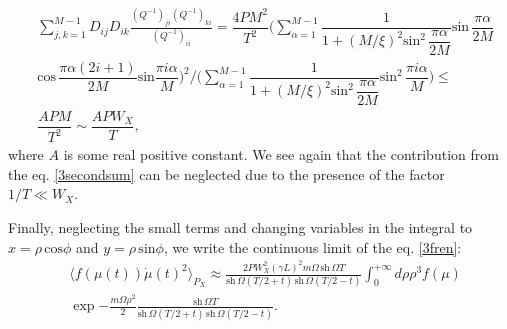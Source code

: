 \documentclass{article}
\begin{document}
\begin{align}\label{3secondsum}
    &\sum_{j,k=1}^{M-1}D_{ij}D_{ik}\frac{(Q^{-1})_{ji}(Q^{-1})_{ki}}{(Q^{-1})_{ii}} = \dfrac{4 P M^{2}}{T^{2}}\Bigg(\sum_{\alpha=1}^{M-1}\dfrac{1}{1+(M/\xi)^{2}\textrm{sin}^{2}\,\dfrac{\pi \alpha}{2M}}\textrm{sin}\,\dfrac{\pi \alpha}{2M}\nonumber\\
    &\textrm{cos}\,\dfrac{\pi \alpha(2i+1)}{2M}\textrm{sin}\dfrac{\pi i \alpha}{M}\Bigg)^{2}\Bigg /\Bigg(\sum_{\alpha=1}^{M-1}\dfrac{1}{1+(M/\xi)^{2}\textrm{sin}^{2}\,\dfrac{\pi \alpha}{2M}}\textrm{sin}^{2}\,\dfrac{\pi i \alpha}{M}\Bigg) \leq\nonumber\\
    & \dfrac{A P M}{T^{2}} \sim \dfrac{A P W_{X}}{T},
\end{align}
where $A$ is some real positive constant. We see again that the contribution from the eq$.$ \eqref{3secondsum} can be neglected due to the presence of the factor $1/T \ll W_{X}$.




Finally, neglecting the small terms and changing variables in the integral to $x=\rho\, \textrm{cos}\phi$ and $y = \rho\, \textrm{sin} \phi$, we write the continuous limit of the eq$.$ \eqref{3fren}: 
\begin{align}\label{faveragecont}
    &\langle f(\mu(t))\dot{\mu}(t)^{2} \rangle_{P_{X}} \approx \frac{2PW_{X}^{2}(\gamma L)^{2}m\Omega\,\textrm{sh}\, \Omega T}{\textrm{sh}\, \Omega (T/2+t) \, \textrm{sh}\, \Omega (T/2-t)} \int_{0}^{+\infty}d\rho \rho^{3}f(\mu)\\\nonumber
    &\exp{-\frac{m\Omega \rho^{2}}{2}\frac{\textrm{sh}\, \Omega T}{\textrm{sh}\, \Omega (T/2+t) \, \textrm{sh}\, \Omega (T/2-t)}}. 
\end{align}
\end{document}
